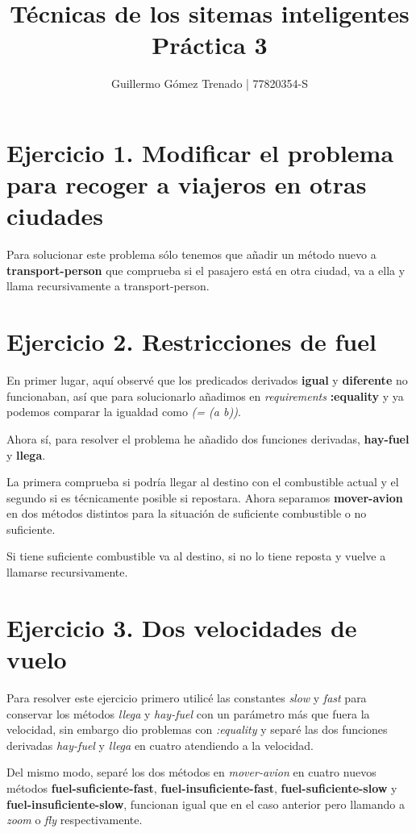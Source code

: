 \documentclass{article}
\title{Técnicas de los sitemas inteligentes\\
Práctica 3}
\author{Guillermo G\'omez Trenado | 77820354-S}
\begin{document}

\maketitle

\section*{Ejercicio 1. Modificar el problema para recoger a viajeros en otras ciudades}

	Para solucionar este problema sólo tenemos que añadir un método nuevo a \textbf{transport-person} que comprueba si el pasajero está en otra ciudad, va a ella y llama recursivamente a transport-person.

\section*{Ejercicio 2. Restricciones de fuel}

	En primer lugar, aquí observé que los predicados derivados \textbf{igual} y \textbf{diferente} no funcionaban, así que para solucionarlo añadimos en \emph{requirements} \textbf{:equality} y ya podemos comparar la igualdad como \emph{(= (a b))}.
	
	Ahora sí, para resolver el problema he añadido dos funciones derivadas, \textbf{hay-fuel} y \textbf{llega}.

	La primera comprueba si podría llegar al destino con el combustible actual y el segundo si es técnicamente posible si repostara. Ahora separamos \textbf{mover-avion} en dos métodos distintos para la situación de suficiente combustible o no suficiente. 
	
	Si tiene suficiente combustible va al destino, si no lo tiene reposta y vuelve a llamarse recursivamente.


\section*{Ejercicio 3. Dos velocidades de vuelo}

Para resolver este ejercicio primero utilicé las constantes \emph{slow} y \emph{fast} para conservar los métodos \emph{llega} y \emph{hay-fuel} con un parámetro más que fuera la velocidad, sin embargo dio problemas con \emph{:equality} y separé las dos funciones derivadas \emph{hay-fuel} y \emph{llega} en cuatro atendiendo a la velocidad. 

Del mismo modo, separé los dos métodos en \emph{mover-avion} en cuatro nuevos métodos \textbf{fuel-suficiente-fast}, \textbf{fuel-insuficiente-fast}, \textbf{fuel-suficiente-slow} y \textbf{fuel-insuficiente-slow}, funcionan igual que en el caso anterior pero llamando a \emph{zoom} o \emph{fly} respectivamente.
\end{document}
